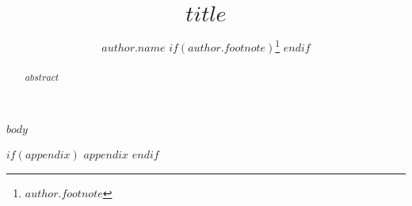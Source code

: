 \documentclass[$format$ ,$hyphenation$ $if(authorcolumns)$ ,authorcolumns $endif$ $if(cleveref)$,cleveref$endif$ $if(autoref)$,autoref$endif$ $if(thm-restate)$,thm-restate$endif$ $if(anonymous)$,anonymous$endif$ $if(numberwithinsect)$,numberwithinsect$endif$ ]{lipics-v2019}
\title{$title$}
\author{$author.name$ $if(author.footnote)$\footnote{$author.footnote$} $endif$}{$author.affiliation$}{$author.email$}{$author.orcid$}{$if(author.funding)$ $author.funding$ $endif$}
\begin{document}
\maketitle

\begin{abstract}
$abstract$
\end{abstract}

$body$





$if(appendix)$
\appendix
$appendix$
$endif$
\end{document}
